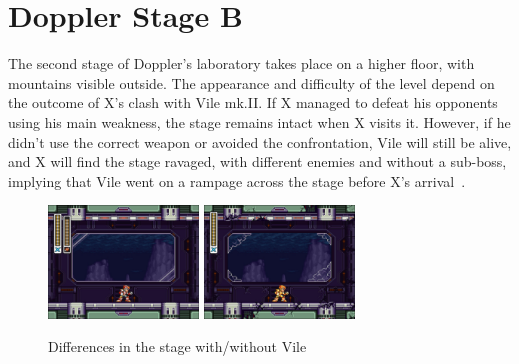 \section{Doppler Stage B}

The second stage of Doppler's laboratory takes place on a higher floor, with mountains visible outside. The appearance and difficulty of the level depend on the outcome of X's clash with Vile mk.II. If X managed to defeat his opponents using his main weakness, the stage remains intact when X visits it. However, if he didn't use the correct weapon or avoided the confrontation, Vile will still be alive, and X will find the stage ravaged, with different enemies and without a sub-boss, implying that Vile went on a rampage across the stage before X's arrival~\cite{wiki:Doppler_stage}.

\begin{figure}[htp]
	\centering
	\includegraphics[height=3cm]{figures/X3/Doppler_stages/dopp_B_1.jpg}
	\includegraphics[height=3cm]{figures/X3/Doppler_stages/dopp_B_2.jpg}
	\caption{Differences in the stage with/without Vile}
\end{figure}

